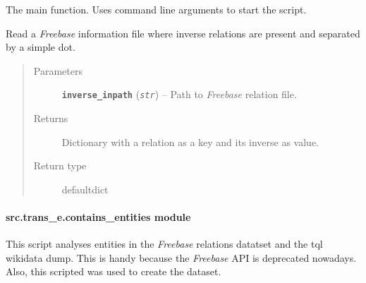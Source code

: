 \documentclass[letterpaper,10pt,english]{sphinxmanual}
\begin{document}

\begin{fulllineitems}
\label{src.trans_e:src.trans_e.add_inverse_relations.main}
The main function. Uses command line arguments to start the script.

\end{fulllineitems}


\begin{fulllineitems}
\label{src.trans_e:src.trans_e.add_inverse_relations.read_file_with_inverse_relations}
Read a \emph{Freebase} information file where inverse relations are present and separated by a simple dot.
\begin{quote}\begin{description}
\item[{Parameters}] \leavevmode
\textbf{\texttt{inverse\_inpath}} (\emph{\texttt{str}}) -- Path to \emph{Freebase} relation file.

\item[{Returns}] \leavevmode
Dictionary with a relation as a key and its inverse as value.

\item[{Return type}] \leavevmode
defaultdict

\end{description}\end{quote}

\end{fulllineitems}



\paragraph{src.trans\_e.contains\_entities module}
\label{src.trans_e:src-trans-e-contains-entities-module}\label{src.trans_e:module-src.trans_e.contains_entities}
This script analyses entities in the \emph{Freebase}  relations datatset and the tql wikidata dump.
This is handy because the \emph{Freebase} API is deprecated nowadays. Also, this scripted was used to create the 
dataset.
\end{document}
